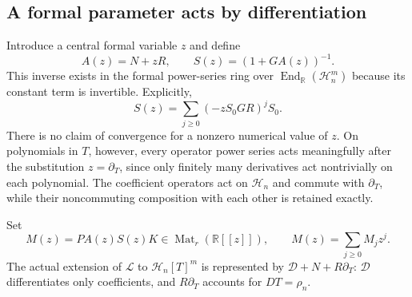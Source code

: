 \documentclass[11pt,a4paper]{article}
\numberwithin{equation}{section}
\theoremstyle{definition}
\theoremstyle{remark}\newtheorem{remark}[theorem]{Remark}
\newcommand{\R}{\mathbb R}\newcommand{\C}{\mathbb C}
\newcommand{\Hh}{\mathcal H}\newcommand{\Ll}{\mathcal L}
\newcommand{\Mat}{\operatorname{Mat}}\newcommand{\End}{\operatorname{End}}
\newcommand{\dd}{\partial_T}\newcommand{\eps}{\varepsilon}
\begin{document}
\subsection{A formal parameter acts by differentiation}
Introduce a central formal variable $z$ and define
\begin{equation}
 A(z)=N+zR,\qquad S(z)=(1+GA(z))^{-1}.
 \label{eq:Sz}
\end{equation}
This inverse exists in the formal power-series ring over $\End_\R(\Hh_n^m)$ because its constant term is invertible. Explicitly,
\begin{equation}
 S(z)=\sum_{j\ge0}(-zS_0GR)^jS_0.
 \label{eq:Sexpansion}
\end{equation}
There is no claim of convergence for a nonzero numerical value of $z$. On polynomials in $T$, however, every operator power series acts meaningfully after the substitution $z=\dd$, since only finitely many derivatives act nontrivially on each polynomial. The coefficient operators act on $\Hh_n$ and commute with $\dd$, while their noncommuting composition with each other is retained exactly.

Set
\begin{equation}
 M(z)=PA(z)S(z)K\in\Mat_r(\R[[z]]),\qquad
 M(z)=\sum_{j\ge0}M_jz^j.
 \label{eq:Mz}
\end{equation}
The actual extension of $\Ll$ to $\Hh_n[T]^m$ is represented by
$\mathcal D+N+R\dd$: $\mathcal D$ differentiates only coefficients, and $R\dd$ accounts for $DT=\rho_n$.
\end{document}
